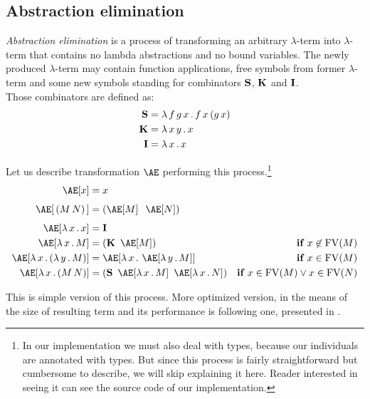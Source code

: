 \documentclass[12pt,a4paper]{report}
\newcommand{\Lets}{Let us\xspace}
\newcommand{\lterm}{$\lambda$-term\xspace}
\begin{document}
\subsection{Abstraction elimination}
\label{toSKI}

\textit{Abstraction elimination} is a process of transforming 
an arbitrary \lterm into \lterm that contains no lambda abstractions
and no bound variables.
The newly produced \lterm may contain function applications, 
free symbols from former \lterm and some new symbols standing for 
combinators $\mathbf{S}$, $\mathbf{K}$ and $\mathbf{I}$. \\

Those combinators are defined as:
\begin{align*}
\mathbf{S} &= \lambda \, f\,g\,x \, . \, f\,x\,(g\,x) \\
\mathbf{K} &= \lambda \, x\,y \, . \, x \\
\mathbf{I} &= \lambda \, x \, . \, x 
\end{align*}

\newcommand{\Ae}{\mathop{\mathrm{\AE}}}

\Lets describe transformation $\Ae$ performing this 
process.\footnote{In our implementation we must also deal with types, because 
our individuals are annotated with types. But since this process
is fairly straightforward but cumbersome to describe, we will 
skip explaining it here. Reader interested in seeing it can see 
the source code of our implementation. }
\begin{align*}
\Ae[x]           &= x &\\[0.4em]
\Ae[\,(M\,N)\,]  &= (\Ae[M]\;\;\Ae[N]) &\\[0.4em]
\Ae[\lam{x}{x}]  &= \Icomb &\\
\Ae[\lam{x}{M}]  &= (\Kcomb~\Ae[M]) &\textbf{if } x \not\in \FV(M)\\
\Ae[\lam{x}{\lamb{y}{M}}] &= \Ae[\lam{x}{\Ae[\lam{y}{M}]}]  
&\textbf{if } x \in \FV(M)\\
\Ae[\lam{x}{(M\,N)}] &= (\Scomb~\Ae[\lam{x}{M}]~\Ae[\lam{x}{N}])  
&\textbf{if } x \in \FV(M) \vee x \in \FV(N)\\
\end{align*}

\newcommand{\Bcomb }{\mathbf{B}}   
\newcommand{\BBcomb }{\mathbf{B*}}
\newcommand{\Ccomb }{\mathbf{C}}   
\newcommand{\CCcomb }{\mathbf{C'}}
\newcommand{\SScomb }{\mathbf{S'}}

This is simple version of this process. More optimized version,
in the means of the size of resulting term and its performance
is following one, presented in \cite{jones87}.\\
\end{document}
